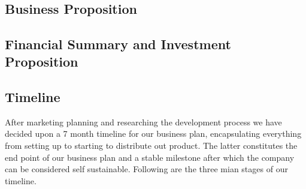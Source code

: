 \documentclass[11pt]{article}
\begin{document}
 \\

  \subsection{Business Proposition}
  \subsection{Financial Summary and Investment Proposition}

\newpage

  \subsection{Timeline}
After marketing planning and researching the development process we have decided upon a 7 month timeline for our business plan, encapsulating everything from setting up to starting to distribute out product. The latter constitutes the end point of our business plan and a stable milestone after which the company can be considered self sustainable. Following are the three mian stages of our timeline.
\end{document}
